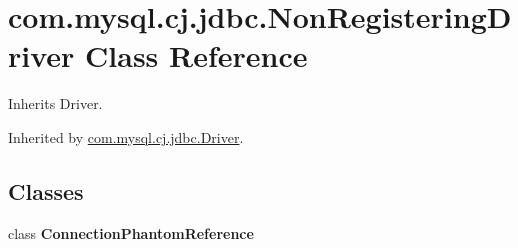 \hypertarget{classcom_1_1mysql_1_1cj_1_1jdbc_1_1_non_registering_driver}{}\section{com.\+mysql.\+cj.\+jdbc.\+Non\+Registering\+Driver Class Reference}
\label{classcom_1_1mysql_1_1cj_1_1jdbc_1_1_non_registering_driver}


Inherits Driver.



Inherited by \mbox{\hyperlink{classcom_1_1mysql_1_1cj_1_1jdbc_1_1_driver}{com.\+mysql.\+cj.\+jdbc.\+Driver}}.

\subsection*{Classes}
\begin{DoxyCompactItemize}
\item 
class {\bfseries Connection\+Phantom\+Reference}
\end{DoxyCompactItemize}
